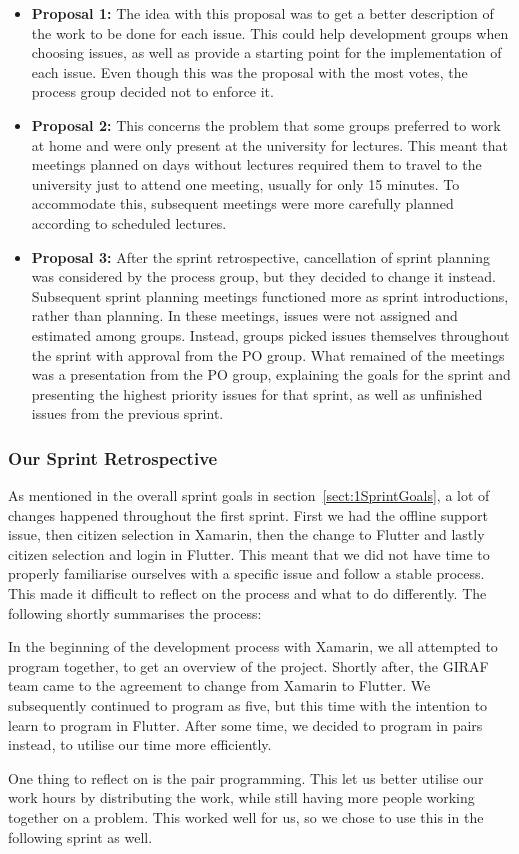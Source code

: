 \begin{itemize}
\item \textbf{Proposal 1:} The idea with this proposal was to get a better description of the work to be done for each issue. This could help development groups when choosing issues, as well as provide a starting point for the implementation of each issue. Even though this was the proposal with the most votes, the process group decided not to enforce it. 

\item \textbf{Proposal 2:} This concerns the problem that some groups preferred to work at home and were only present at the university for lectures. This meant that meetings planned on days without lectures required them to travel to the university just to attend one meeting, usually for only 15 minutes. To accommodate this, subsequent meetings were more carefully planned according to scheduled lectures. 

\item \textbf{Proposal 3:} After the sprint retrospective, cancellation of sprint planning was considered by the process group, but they decided to change it instead. Subsequent sprint planning meetings functioned more as sprint introductions, rather than planning. In these meetings, issues were not assigned and estimated among groups. Instead, groups picked issues themselves throughout the sprint with approval from the PO group. What remained of the meetings was a presentation from the PO group, explaining the goals for the sprint and presenting the highest priority issues for that sprint, as well as unfinished issues from the previous sprint.
\end{itemize}

\subsubsection{Our Sprint Retrospective}
\label{sect:ourRetrospectiveSprint1}
As mentioned in the overall sprint goals in section~\ref{sect:1SprintGoals}, a lot of changes happened throughout the first sprint. First we had the offline support issue, then citizen selection in Xamarin, then the change to Flutter and lastly citizen selection and login in Flutter. This meant that we did not have time to properly familiarise ourselves with a specific issue and follow a stable process. This made it difficult to reflect on the process and what to do differently. The following shortly summarises the process:

In the beginning of the development process with Xamarin, we all attempted to program together, to get an overview of the project. Shortly after, the GIRAF team came to the agreement to change from Xamarin to Flutter. 
We subsequently continued to program as five, but this time with the intention to learn to program in Flutter.
After some time, we decided to program in pairs instead, to utilise our time more efficiently.

One thing to reflect on is the pair programming. This let us better utilise our work hours by distributing the work, while still having more people working together on a problem. This worked well for us, so we chose to use this in the following sprint as well.